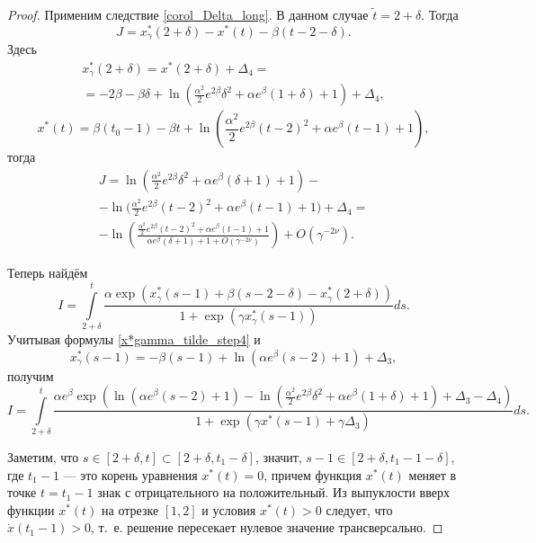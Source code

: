 \begin{proof}
%
Применим следствие \ref{corol_Delta_long}. В данном случае $\tilde{t} = 2 + \delta$.
Тогда
%
\[
J = x_\gamma^*(2 + \delta) - x^*(t) - \beta(t - 2 - \delta).
\]
%
Здесь
\begin{multline}
	\label{x*gamma_tilde_step4}
	x_\gamma^*(2 + \delta) = x^*(2 + \delta) + \Delta_4 = \\
	= -2 \beta - \beta \delta + \ln\left(\frac{\alpha^2}{2} e^{2\beta} \delta^2 + \alpha e^{\beta} (1 + \delta) + 1 \right) + \Delta_4,
\end{multline}
%
\[ %
x^*(t) = \beta(t_0 - 1) - \beta t + \ln\left(\frac{\alpha^2}{2} e^{2\beta}(t - 2)^2 + \alpha e^{\beta}(t - 1) + 1\right),
\]
%
тогда
\begin{multline}
	\label{J_step5}
	J = \ln\left(\frac{\alpha^2}{2}e^{2\beta}\delta^2 + \alpha e^{\beta}(\delta + 1) + 1 \right) -\\- \ln\Big(\frac{\alpha^2}{2}e^{2\beta}(t - 2)^2+\alpha e^{\beta}(t - 1) + 1 \Big) + \Delta_4=
	\\
	-\ln\left(\frac{\frac{\alpha^2}{2}e^{2\beta}(t - 2)^2+\alpha e^{\beta}(t - 1) + 1}{\alpha e^{\beta}(\delta + 1) + 1 + O(\gamma^{-2\nu})}\right) + O(\gamma^{-2\nu}).
\end{multline}

Теперь найдём
\begin{equation*}
	I = \int\limits_{2 + \delta}^{t} \frac{\alpha \exp(x_\gamma^*(s - 1) + \beta(s - 2 - \delta) - x_\gamma^*(2 + \delta))}{1 + \exp(\gamma x_\gamma^*(s - 1))}ds.
\end{equation*}
Учитывая формулы \eqref{x*gamma_tilde_step4} и
%
\[
x_\gamma^*(s-1) = -\beta (s - 1) + \ln(\alpha e^{\beta}(s - 2) + 1) + \Delta_3,
\]
%
получим
%
\small
\begin{equation*}
	I = \int\limits_{2 + \delta}^{t}\frac{\alpha e^\beta \exp\left( \ln(\alpha e^{\beta}(s - 2) + 1) - \ln(\frac{\alpha^2}{2} e^{2\beta} \delta^2 + \alpha e^{\beta}(1 + \delta) + 1) + \Delta_3 - \Delta_4 \right)}{1 + \exp\left(\gamma x^*(s-1)  +\gamma\Delta_3\right)} ds.
\end{equation*}
\normalsize

Заметим, что $s \in [2 + \delta, t] \subset [2 + \delta, t_1 - \delta]$, значит, $s - 1 \in [2 + \delta, t_1 - 1 - \delta]$, где $t_1 - 1$ --- это корень уравнения $x^*(t)=0$, причем функция $x^*(t)$ меняет в точке $t = t_1 - 1$ знак с отрицательного на положительный. Из выпуклости вверх функции $x^*(t)$ на отрезке $[1, 2]$ и условия $x^*(t) > 0$ следует, что $\dot{x}(t_1 - 1) > 0$, т.~е. решение пересекает нулевое значение трансверсально.


\end{proof}
